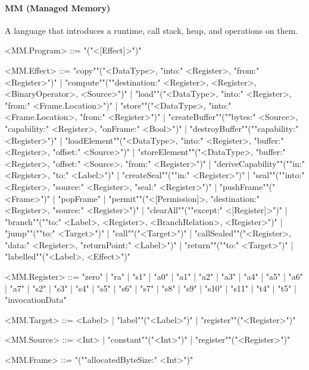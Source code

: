 \documentclass[main.tex]{subfiles}
\begin{document}
\paragraph{ MM (Managed Memory) } A language that introduces a runtime, call stack, heap, and operations on them.
\begin{grammar}
	\footnotesize
				<MM.Program> ::=
							"("<[Effect]>")"
				\par
				<MM.Effect> ::=
						"copy""("<DataType>, "into:" <Register>, "from:" <Register>")"
						| "compute""(""destination:" <Register>, <Register>, <BinaryOperator>, <Source>")"
						| "load""("<DataType>, "into:" <Register>, "from:" <Frame.Location>")"
						| "store""("<DataType>, "into:" <Frame.Location>, "from:" <Register>")"
						| "createBuffer""(""bytes:" <Source>, "capability:" <Register>, "onFrame:" <Bool>")"
						| "destroyBuffer""(""capability:" <Register>")"
						| "loadElement""("<DataType>, "into:" <Register>, "buffer:" <Register>, "offset:" <Source>")"
						| "storeElement""("<DataType>, "buffer:" <Register>, "offset:" <Source>, "from:" <Register>")"
						| "deriveCapability""(""in:" <Register>, "to:" <Label>")"
						| "createSeal""(""in:" <Register>")"
						| "seal""(""into:" <Register>, "source:" <Register>, "seal:" <Register>")"
						| "pushFrame""("<Frame>")"
						| "popFrame"
						| "permit""("<[Permission]>, "destination:" <Register>, "source:" <Register>")"
						| "clearAll""(""except:" <[Register]>")"
						| "branch""(""to:" <Label>, <Register>, <BranchRelation>, <Register>")"
						| "jump""(""to:" <Target>")"
						| "call""("<Target>")"
						| "callSealed""("<Register>, "data:" <Register>, "returnPoint:" <Label>")"
						| "return""(""to:" <Target>")"
						| "labelled""("<Label>, <Effect>")"
				\par
				<MM.Register> ::=
						"zero"
						| "ra"
						| "s1"
						| "a0"
						| "a1"
						| "a2"
						| "a3"
						| "a4"
						| "a5"
						| "a6"
						| "a7"
						| "s2"
						| "s3"
						| "s4"
						| "s5"
						| "s6"
						| "s7"
						| "s8"
						| "s9"
						| "s10"
						| "s11"
						| "t4"
						| "t5"
						| "invocationData"
				\par
				<MM.Target> ::=
								<Label> |
						"label""("<Label>")"
						| "register""("<Register>")"
				\par
				<MM.Source> ::=
						<Int> |
						"constant""("<Int>")"
						| "register""("<Register>")"
				\par
				<MM.Frame> ::=
							"(""allocatedByteSize:" <Int>")"
				\par
\end{grammar}
\par
\end{document}
